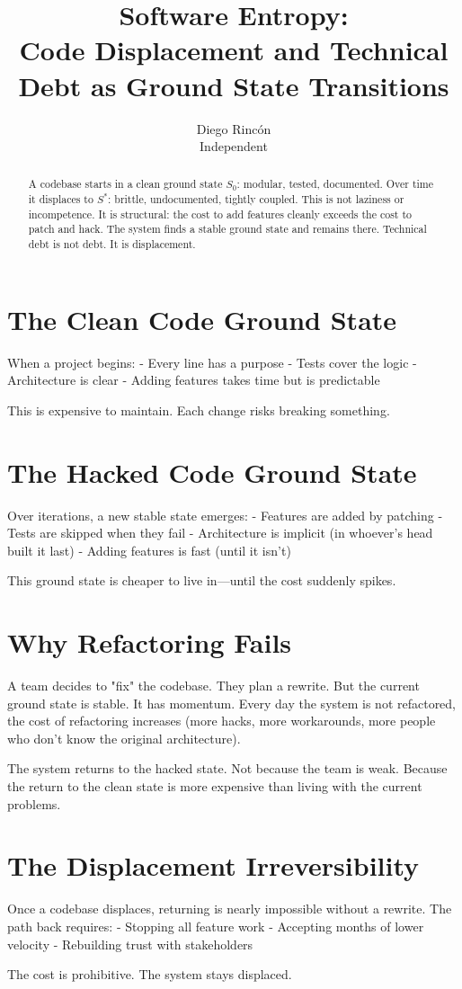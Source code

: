 \documentclass[12pt]{article}
\title{Software Entropy:\\
Code Displacement and Technical Debt as Ground State Transitions}
\author{Diego Rincón\\
\small Independent}
\date{}
\begin{document}
\maketitle

\begin{abstract}
A codebase starts in a clean ground state $S_0$: modular, tested, documented. Over time it displaces to $S^*$: brittle, undocumented, tightly coupled. This is not laziness or incompetence. It is structural: the cost to add features cleanly exceeds the cost to patch and hack. The system finds a stable ground state and remains there. Technical debt is not debt. It is displacement.
\end{abstract}

\section{The Clean Code Ground State}

When a project begins:
- Every line has a purpose
- Tests cover the logic
- Architecture is clear
- Adding features takes time but is predictable

This is expensive to maintain. Each change risks breaking something.

\section{The Hacked Code Ground State}

Over iterations, a new stable state emerges:
- Features are added by patching
- Tests are skipped when they fail
- Architecture is implicit (in whoever's head built it last)
- Adding features is fast (until it isn't)

This ground state is cheaper to live in—until the cost suddenly spikes.

\section{Why Refactoring Fails}

A team decides to "fix" the codebase. They plan a rewrite. But the current ground state is stable. It has momentum. Every day the system is not refactored, the cost of refactoring increases (more hacks, more workarounds, more people who don't know the original architecture).

The system returns to the hacked state. Not because the team is weak. Because the return to the clean state is more expensive than living with the current problems.

\section{The Displacement Irreversibility}

Once a codebase displaces, returning is nearly impossible without a rewrite. The path back requires:
- Stopping all feature work
- Accepting months of lower velocity
- Rebuilding trust with stakeholders

The cost is prohibitive. The system stays displaced.
\end{document}
